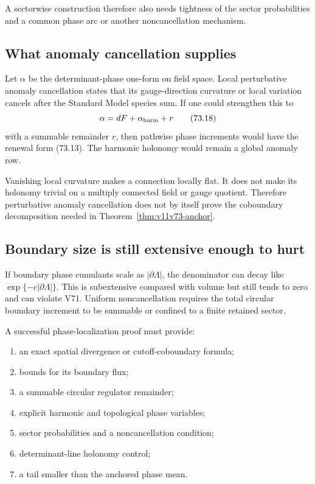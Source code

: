 \documentclass[11pt]{article}
\begin{document}
A sectorwise construction therefore also needs tightness of the sector
probabilities and a common phase arc or another noncancellation
mechanism.

\subsection{What anomaly cancellation supplies}

Let \(\alpha\) be the determinant-phase one-form on field space.  Local
perturbative anomaly cancellation states that its gauge-direction
curvature or local variation cancels after the Standard Model species
sum.  If one could strengthen this to
\[
                         \alpha=dF+\alpha_{\rm harm}+r         \tag{73.18}
\]
with a summable remainder \(r\), then pathwise phase increments would
have the renewal form (73.13).  The harmonic holonomy would remain a
global anomaly row.

\begin{warning}
\label{warn:v11v73-closed}
Vanishing local curvature makes a connection locally flat.  It does
not make its holonomy trivial on a multiply connected field or gauge
quotient.  Therefore perturbative anomaly cancellation does not by
itself prove the coboundary decomposition needed in
Theorem~\ref{thm:v11v73-anchor}.
\end{warning}

\subsection{Boundary size is still extensive enough to hurt}

If boundary phase cumulants scale as \(|\partial\Lambda|\), the
denominator can decay like
\(\exp\{-c|\partial\Lambda|\}\).  This is subextensive compared with
volume but still tends to zero and can violate V71.  Uniform
noncancellation requires the total circular boundary increment to be
summable or confined to a finite retained sector.

\begin{ledger}
\label{led:v11v73-data}
A successful phase-localization proof must provide:
\begin{enumerate}
\item an exact spatial divergence or cutoff-coboundary formula;
\item bounds for its boundary flux;
\item a summable circular regulator remainder;
\item explicit harmonic and topological phase variables;
\item sector probabilities and a noncancellation condition;
\item determinant-line holonomy control;
\item a tail smaller than the anchored phase mean.
\end{enumerate}
\end{ledger}
\end{document}
